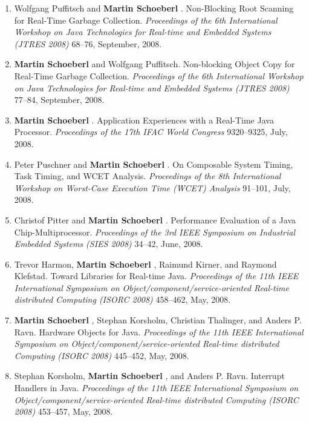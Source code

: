 \begin{enumerate}
\item Wolfgang Puffitsch and {\bf Martin Schoeberl }.
 Non-Blocking Root Scanning for Real-Time Garbage Collection.
 \emph{Proceedings of the 6th International Workshop on Java Technologies for Real-time and Embedded Systems (JTRES 2008)} 68--76, September, 2008.

\item {\bf Martin Schoeberl } and Wolfgang Puffitsch.
 Non-blocking Object Copy for Real-Time Garbage Collection.
 \emph{Proceedings of the 6th International Workshop on Java Technologies for Real-time and Embedded Systems (JTRES 2008)} 77--84, September, 2008.

\item {\bf Martin Schoeberl }.
 Application Experiences with a Real-Time Java Processor.
 \emph{Proceedings of the 17th IFAC World Congress} 9320--9325, July, 2008.

\item Peter Puschner and {\bf Martin Schoeberl }.
 On Composable System Timing, Task Timing, and WCET Analysis.
 \emph{Proceedings of the 8th International Workshop on Worst-Case Execution Time (WCET) Analysis} 91--101, July, 2008.

\item Christof Pitter and {\bf Martin Schoeberl }.
 Performance Evaluation of a Java Chip-Multiprocessor.
 \emph{Proceedings of the 3rd IEEE Symposium on Industrial Embedded Systems (SIES 2008)} 34--42, June, 2008.

\item Trevor Harmon, {\bf Martin Schoeberl }, Raimund Kirner, and Raymond Klefstad.
 Toward Libraries for Real-time Java.
 \emph{Proceedings of the 11th IEEE International Symposium on Object/component/service-oriented Real-time distributed Computing (ISORC 2008)} 458--462, May, 2008.

\item {\bf Martin Schoeberl }, Stephan Korsholm, Christian Thalinger, and Anders P. Ravn.
 Hardware Objects for Java.
 \emph{Proceedings of the 11th IEEE International Symposium on Object/component/service-oriented Real-time distributed Computing (ISORC 2008)} 445--452, May, 2008.

\item Stephan Korsholm, {\bf Martin Schoeberl }, and Anders P. Ravn.
 Interrupt Handlers in Java.
 \emph{Proceedings of the 11th IEEE International Symposium on Object/component/service-oriented Real-time distributed Computing (ISORC 2008)} 453--457, May, 2008.


\end{enumerate}
